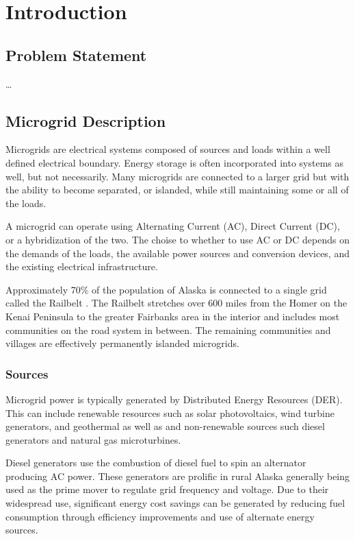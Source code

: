 \chapter{Introduction}

\section{Problem Statement}

\ldots

\section{Microgrid Description}
Microgrids are electrical systems composed of sources and loads within a well defined electrical boundary. Energy storage is often incorporated into systems as well, but not necessarily. Many microgrids are connected to a larger grid but with the ability to become separated, or islanded, while still maintaining some or all of the loads.

A microgrid can operate using Alternating Current (AC), Direct Current (DC), or a hybridization of the two. The choise to whether to use AC or DC depends on the demands of the loads, the available power sources and conversion devices, and the existing electrical infrastructure.

Approximately 70\% of the population of Alaska is connected to a single grid called the Railbelt \cite{railbelt}. The Railbelt stretches over 600 miles from the Homer on the Kenai Peninsula to the greater Fairbanks area in the interior and includes most communities on the road system in between. The remaining communities and villages are effectively permanently islanded microgrids. 

\subsection{Sources}
Microgrid power is typically generated by Distributed Energy Resources (DER). This can include renewable resources such as solar photovoltaics, wind turbine generators, and geothermal as well as and non-renewable sources such diesel generators and natural gas microturbines. 

Diesel generators use the combustion of diesel fuel to spin an alternator producing AC power. These generators are prolific in rural Alaska generally being used as the prime mover to regulate grid frequency and voltage. 
Due to their widespread use, significant energy cost savings can be generated by reducing fuel consumption through efficiency improvements and use of alternate energy sources.

